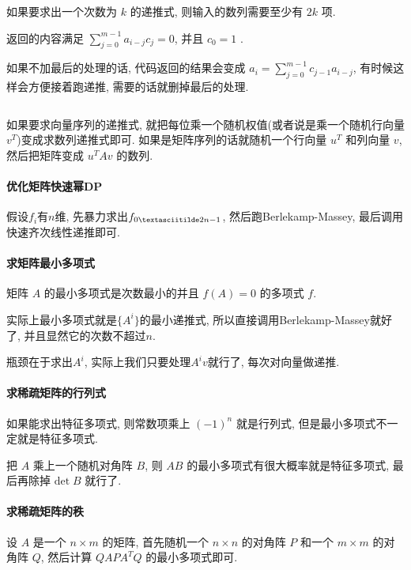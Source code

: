 如果要求出一个次数为 $k$ 的递推式, 则输入的数列需要至少有 $2k$ 项.

返回的内容满足 $\sum_{j = 0} ^ {m - 1} a_{i - j} c_j = 0$, 并且 $c_0 = 1$ .

如果不加最后的处理的话, 代码返回的结果会变成 $a_i = \sum_{j = 0} ^ {m - 1} c_{j - 1} a_{i - j}$, 有时候这样会方便接着跑递推, 需要的话就删掉最后的处理.

\inputminted{cpp}{src/Math/Berlekamp-Massey.cpp}

如果要求向量序列的递推式, 就把每位乘一个随机权值(或者说是乘一个随机行向量 $v^T$)变成求数列递推式即可. 如果是矩阵序列的话就随机一个行向量 $u^T$ 和列向量 $v$, 然后把矩阵变成 $u^T A v$ 的数列.

\paragraph*{优化矩阵快速幂DP}

	假设$f_i$有$n$维, 先暴力求出$f_{0\textasciitilde 2n - 1}$, 然后跑Berlekamp-Massey, 最后调用快速齐次线性递推即可.

\paragraph*{求矩阵最小多项式}

	矩阵 $A$ 的最小多项式是次数最小的并且 $f(A) = 0$ 的多项式 $f$.

	实际上最小多项式就是$\{A^i\}$的最小递推式, 所以直接调用Berlekamp-Massey就好了, 并且显然它的次数不超过$n$.

	瓶颈在于求出$A^i$, 实际上我们只要处理$A^i v$就行了, 每次对向量做递推.

\paragraph*{求稀疏矩阵的行列式}

	如果能求出特征多项式, 则常数项乘上 $(-1)^n$ 就是行列式, 但是最小多项式不一定就是特征多项式.

	把 $A$ 乘上一个随机对角阵 $B$, 则 $AB$ 的最小多项式有很大概率就是特征多项式, 最后再除掉 $\text{det}\;B$ 就行了.

\paragraph*{求稀疏矩阵的秩}

	设 $A$ 是一个 $n\times m$ 的矩阵, 首先随机一个 $n\times n$ 的对角阵 $P$ 和一个 $m\times m$ 的对角阵 $Q$, 然后计算 $Q A P A^T Q$ 的最小多项式即可.

